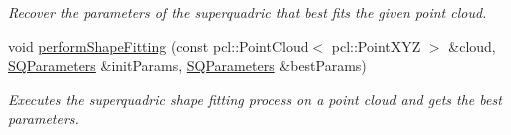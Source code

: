 \begin{DoxyCompactItemize}
\begin{DoxyCompactList}\small\item\em Recover the parameters of the superquadric that best fits the given point cloud. \end{DoxyCompactList}\item 
void \hyperlink{namespaceope_a33a980d43bb42f595c8742da80795961}{perform\-Shape\-Fitting} (const pcl\-::\-Point\-Cloud$<$ pcl\-::\-Point\-X\-Y\-Z $>$ \&cloud, \hyperlink{classope_1_1_s_q_parameters}{S\-Q\-Parameters} \&init\-Params, \hyperlink{classope_1_1_s_q_parameters}{S\-Q\-Parameters} \&best\-Params)
\begin{DoxyCompactList}\small\item\em Executes the superquadric shape fitting process on a point cloud and gets the best parameters. \end{DoxyCompactList}\end{DoxyCompactItemize}
